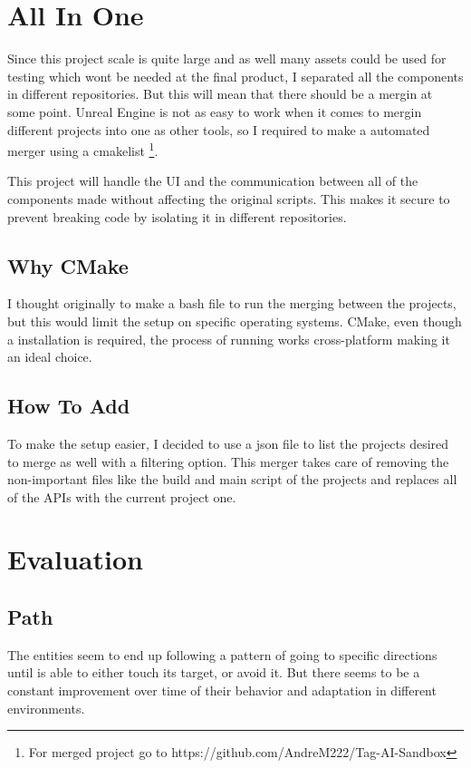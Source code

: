 \documentclass[10pt, letterpaper]{article}
\begin{document}
\begin{Form}
    \section{All In One}

    Since this project scale is quite large and as well many assets could be used for testing which wont be needed at the
    final product, I separated all the components in different repositories. But this will mean that there should
    be a mergin at some point. Unreal Engine is not as easy to work when it comes to mergin different projects
    into one as other tools, so I required to make a automated merger using a cmakelist
    \footnote{For merged project go to https://github.com/AndreM222/Tag-AI-Sandbox}.

    This project will handle the UI and the communication between all of the components made without affecting
    the original scripts. This makes it secure to prevent breaking code by isolating it in different repositories.

    \subsection{Why CMake}

    I thought originally to make a bash file to run the merging between the projects, but this would limit the
    setup on specific operating systems. CMake, even though a installation is required, the process of running
    works cross-platform making it an ideal choice.

    \subsection{How To Add}

    To make the setup easier, I decided to use a json file to list the projects desired to merge as well
    with a filtering option. This merger takes care of removing the non-important files like the build and
    main script of the projects and replaces all of the APIs with the current project one.

	\section{Evaluation}

	\subsection{Path}
	The entities seem to end up following a pattern of going to specific directions until is able to either touch
	its target, or avoid it. But there seems to be a constant improvement over time of their behavior and adaptation in
	different environments.


\end{Form}
\end{document}
